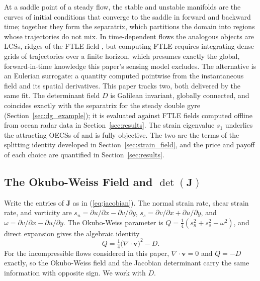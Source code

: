 \documentclass[lettersize,journal]{IEEEtran}
\begin{document}
At a saddle point of a steady flow, the stable and unstable manifolds
are the curves of initial conditions that converge to the saddle in
forward and backward time; together they form the separatrix, which
partitions the domain into regions whose trajectories do not mix. In
time-dependent flows the analogous objects are LCSs, ridges of the FTLE
field \cite{6,7,8}, but computing FTLE requires integrating dense grids
of trajectories over a finite horizon, which presumes exactly the
global, forward-in-time knowledge this paper's sensing model excludes.
The alternative is an Eulerian surrogate: a quantity computed pointwise
from the instantaneous field and its spatial derivatives. This paper
tracks two, both delivered by the same fit. The determinant field $D$
is Galilean invariant, globally connected, and coincides exactly with
the separatrix for the steady double gyre
(Section~\ref{sec:dg_example}); it is evaluated against FTLE fields
computed offline from ocean radar data in Section~\ref{sec:results}.
The strain eigenvalue $s_1$ underlies the attracting OECSs of
\cite{17,18} and is fully objective. The two are the terms of the
splitting identity developed in Section~\ref{sec:strain_field}, and the
price and payoff of each choice are quantified in
Section~\ref{sec:results}.

\subsection{The Okubo-Weiss Field and $\det(\mathbf{J})$}

Write the entries of $\mathbf{J}$ as in (\ref{eq:jacobian}). The normal
strain rate, shear strain rate, and vorticity are
$s_n = \partial u/\partial x - \partial v/\partial y$,
$s_s = \partial v/\partial x + \partial u/\partial y$, and
$\omega = \partial v/\partial x - \partial u/\partial y$. The Okubo-Weiss
parameter \cite{21,22} is $Q = \tfrac{1}{4}(s_n^2 + s_s^2 - \omega^2)$, and
direct expansion gives the algebraic identity
\begin{equation}
    Q = \tfrac{1}{4}\bigl(\nabla \cdot \mathbf{v}\bigr)^2 - D.
    \label{eq:okubo_weiss}
\end{equation}
For the incompressible flows considered in this paper,
$\nabla \cdot \mathbf{v} = 0$ and $Q = -D$ exactly, so the Okubo-Weiss
field and the Jacobian determinant carry the same information with
opposite sign. We work with $D$.
\end{document}

